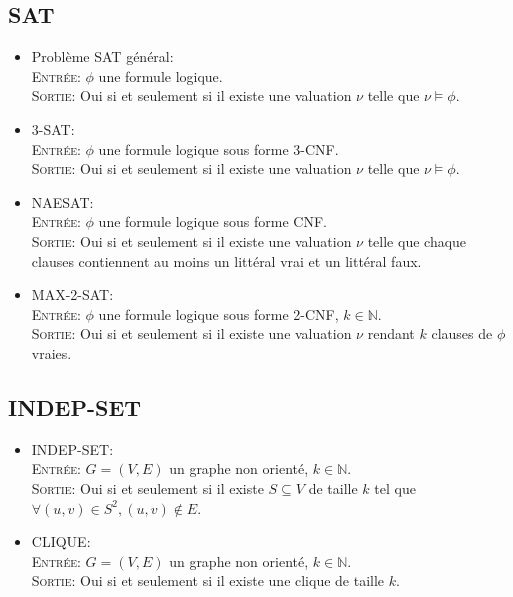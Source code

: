 \subsection*{SAT}
\begin{itemize}
\item Problème SAT général: \\
  \textsc{Entrée}: $\phi$ une formule logique. \\
  \textsc{Sortie}: Oui si et seulement si il existe une valuation $\nu$
  telle que $\nu \models \phi$.\\
\item 3-SAT:\\
  \textsc{Entrée}: $\phi$ une formule logique sous forme 3-CNF. \\
  \textsc{Sortie}: Oui si et seulement si il existe une valuation $\nu$
  telle que $\nu \models \phi$.\\
\item NAESAT: \\
  \textsc{Entrée}: $\phi$ une formule logique sous forme CNF. \\
  \textsc{Sortie}: Oui si et seulement si il existe une valuation
  $\nu$ telle que chaque clauses contiennent au moins un littéral vrai
  et un littéral faux.\\
\item MAX-2-SAT: \\
  \textsc{Entrée}: $\phi$ une formule logique sous forme 2-CNF, $k \in
  \mathbb{N}$. \\
  \textsc{Sortie}: Oui si et seulement si il existe une valuation $\nu$
  rendant $k$ clauses de $\phi$ vraies.\\
\end{itemize}


\subsection*{INDEP-SET}
\begin{itemize}
\item INDEP-SET: \\
  \textsc{Entrée}: $G = (V, E)$ un graphe non orienté, $k\in \mathbb{N}$. \\
  \textsc{Sortie}: Oui si et seulement si il existe $S \subseteq V$ de
  taille $k$ tel que $\forall (u,v) \in S^{2}, (u,v) \notin E$.\\
\item CLIQUE: \\
  \textsc{Entrée}: $G = (V, E)$ un graphe non orienté, $k\in \mathbb{N}$. \\
  \textsc{Sortie}: Oui si et seulement si il existe une clique de taille
  $k$.\\
\end{itemize}

